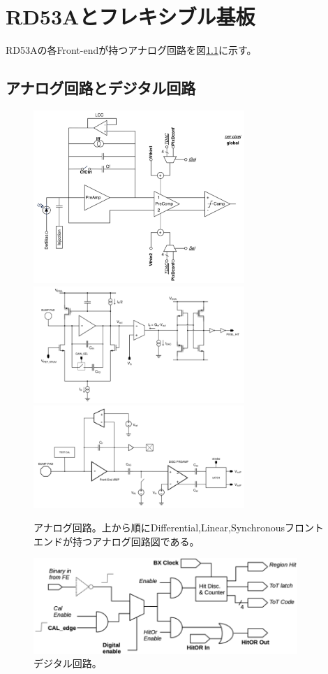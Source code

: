 \chapter{RD53Aとフレキシブル基板} \label{chap:rd53a_circit}
RD53Aの各Front-endが持つアナログ回路を図\ref{analog_fe}に示す。

\section{アナログ回路とデジタル回路}
\begin{figure}[bpt]
  \begin{center}
    \includegraphics[width=8cm]{./diff_fe.png}
    \includegraphics[width=8cm]{./lin_fe.png}
    \includegraphics[width=8cm]{./syn_fe.png}
  \caption[アナログ回路]{アナログ回路\cite{2-1}。上から順にDifferential,Linear,Synchronousフロントエンドが持つアナログ回路図である。}
  \label{analog_fe}
  \end{center}
\end{figure}

\begin{figure}[bpt]\centering
\includegraphics[width=10cm]{./digital_fe.png}
\caption[デジタル回路]{デジタル回路\cite{2-1}。}
\label{digital_fe}
\end{figure}

